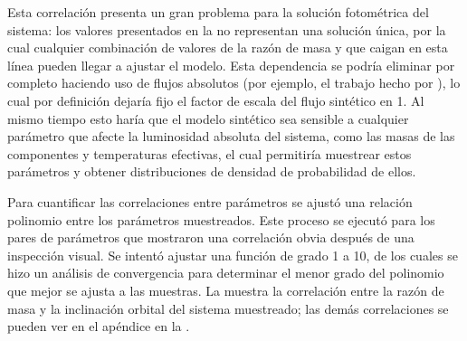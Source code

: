 Esta correlación presenta un gran problema para la solución fotométrica del
sistema: los valores presentados en la
 no
representan una solución única, por la cual cualquier combinación de valores de
la razón de masa y  que caigan en esta línea pueden llegar a
ajustar el modelo. Esta dependencia se podría eliminar por completo haciendo uso
de flujos absolutos (por ejemplo, el trabajo hecho por
),
lo cual por definición dejaría fijo el factor de escala del flujo sintético en
1. Al mismo tiempo esto haría que el modelo sintético sea sensible a cualquier
parámetro que afecte la luminosidad absoluta del sistema, como las masas de las
componentes y temperaturas efectivas, el cual permitiría muestrear estos
parámetros y obtener distribuciones de densidad de probabilidad de ellos.

Para cuantificar las correlaciones entre parámetros se ajustó una relación
polinomio entre los parámetros muestreados. Este proceso se ejecutó para los
pares de parámetros que mostraron una correlación obvia después de una
inspección visual. Se intentó ajustar una función de grado 1 a 10, de los cuales
se hizo un análisis de convergencia para determinar el menor grado del polinomio
que mejor se ajusta a las muestras. La 
muestra la correlación entre la razón de masa y la inclinación orbital del
sistema muestreado; las demás correlaciones se pueden ver en el apéndice en la
.

